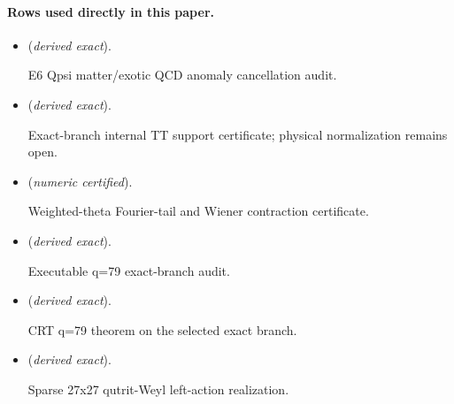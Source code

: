 \documentclass[11pt]{article}
\begin{document}
\paragraph{Rows used directly in this paper.}
\begin{itemize}
\setlength{\itemsep}{0.25em}
\item {} (\emph{derived exact}).\par E6 Qpsi matter/exotic QCD anomaly cancellation audit.
\item {} (\emph{derived exact}).\par Exact-branch internal TT support certificate; physical normalization remains open.
\item {} (\emph{numeric certified}).\par Weighted-theta Fourier-tail and Wiener contraction certificate.
\item {} (\emph{derived exact}).\par Executable q=79 exact-branch audit.
\item {} (\emph{derived exact}).\par CRT q=79 theorem on the selected exact branch.
\item {} (\emph{derived exact}).\par Sparse 27x27 qutrit-Weyl left-action realization.
\end{itemize}
\end{document}

